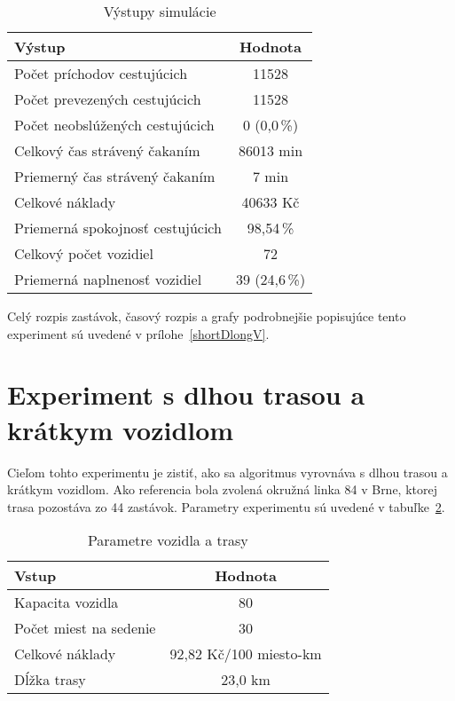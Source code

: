 \begin{table}[h]
  \centering
  \begin{tabular}{|l|c|}
    \hline
      \textbf{Výstup} & \textbf{Hodnota} \\ \hline
      Počet príchodov cestujúcich & 11528 \\ \hline
      Počet prevezených cestujúcich & 11528 \\ \hline
      Počet neobslúžených cestujúcich & 0 (0,0\,\%) \\ \hline
      Celkový čas strávený čakaním & 86013 min \\ \hline
      Priemerný čas strávený čakaním & 7 min \\ \hline
      Celkové náklady & 40633 Kč \\ \hline
      Priemerná spokojnosť cestujúcich & 98,54\,\% \\ \hline
      Celkový počet vozidiel & 72 \\ \hline
      Priemerná naplnenosť vozidiel & 39 (24,6\,\%) \\ \hline
  \end{tabular}
  \caption{Výstupy simulácie}
  \label{tab:shortDlongVout}
\end{table}

Celý rozpis zastávok, časový rozpis a grafy podrobnejšie popisujúce tento experiment sú uvedené v prílohe~\ref{shortDlongV}.

\newpage

\section{Experiment s dlhou trasou a krátkym vozidlom}
Cieľom tohto experimentu je zistiť, ako sa algoritmus vyrovnáva s dlhou trasou a krátkym vozidlom.
Ako referencia bola zvolená okružná linka 84 v Brne, ktorej trasa pozostáva zo 44 zastávok.
Parametry experimentu sú uvedené v tabuľke~\ref{tab:longDshortVin}.

\begin{table}[h]
  \centering
  \begin{tabular}{|l|c|}
    \hline
    \textbf{Vstup} & \textbf{Hodnota} \\ \hline
    Kapacita vozidla & 80 \\ \hline
    Počet miest na sedenie & 30 \\ \hline
    Celkové náklady & 92,82 Kč/100 miesto-km \\ \hline
    Dĺžka trasy & 23,0 km \\ \hline
  \end{tabular}
  \caption{Parametre vozidla a trasy}
  \label{tab:longDshortVin}
\end{table}

